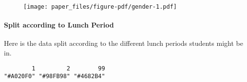\documentclass[
]{apa7}
\let\oldparagraph\paragraph
\renewcommand{\paragraph}[1]{\oldparagraph{#1}\mbox{}}
\newenvironment{Shaded}{\begin{snugshade}}{\end{snugshade}}
\newcommand{\CommentTok}[1]{\textcolor[rgb]{0.37,0.37,0.37}{#1}}
\newcommand{\FunctionTok}[1]{\textcolor[rgb]{0.28,0.35,0.67}{#1}}
\newcommand{\NormalTok}[1]{\textcolor[rgb]{0.00,0.23,0.31}{#1}}
\newcommand{\OtherTok}[1]{\textcolor[rgb]{0.00,0.23,0.31}{#1}}
\newcommand{\SpecialCharTok}[1]{\textcolor[rgb]{0.37,0.37,0.37}{#1}}
\newcommand{\StringTok}[1]{\textcolor[rgb]{0.13,0.47,0.30}{#1}}
\begin{document}
\begin{figure}[H]

{\centering \texttt{[image: paper\_files/figure-pdf/gender-1.pdf]}

}

\end{figure}

\hypertarget{split-according-to-lunch-period}{%
\paragraph{Split according to Lunch
Period}\label{split-according-to-lunch-period}}

Here is the data split according to the different lunch periods students
might be in.

\begin{Shaded}
\end{Shaded}

\begin{verbatim}
        1         2        99 
"#A020F0" "#98FB98" "#4682B4" 
\end{verbatim}
\end{document}
